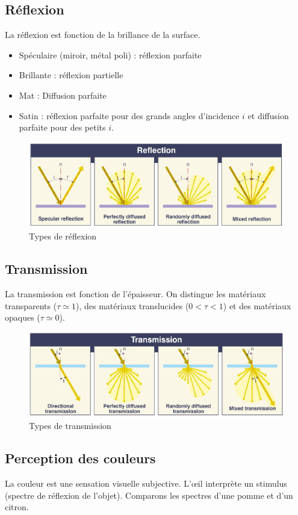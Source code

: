\documentclass[11pt]{report}
\begin{document}
\subsection{Réflexion}
La réflexion est fonction de la brillance de la surface. 
\begin{itemize}
\item Spéculaire (miroir, métal poli) : réflexion parfaite
\item Brillante : réflexion partielle
\item Mat : Diffusion parfaite
\item Satin : réflexion parfaite pour des grands angles d'incidence $i$ et diffusion parfaite pour des petits $i$.
\end{itemize}
\begin{figure}
\centering
\includegraphics[width=0.72\linewidth]{refle}
\caption{Types de réflexion}
\end{figure}



\subsection{Transmission}
La transmission est fonction de l'épaisseur. On distingue les matériaux transparents ($\tau \simeq 1$), des matériaux translucides ($0 < \tau < 1$) et des matériaux opaques ($\tau \simeq 0$). 
\begin{figure}
\centering
\includegraphics[width=0.72\linewidth]{trans}
\caption{Types de transmission}
\end{figure}



\subsection{Perception des couleurs}
La couleur est une sensation visuelle subjective. L'œil interprète un stimulus (spectre de réflexion de l'objet). Comparons les spectres d'une pomme et d'un citron. 
\end{document}
